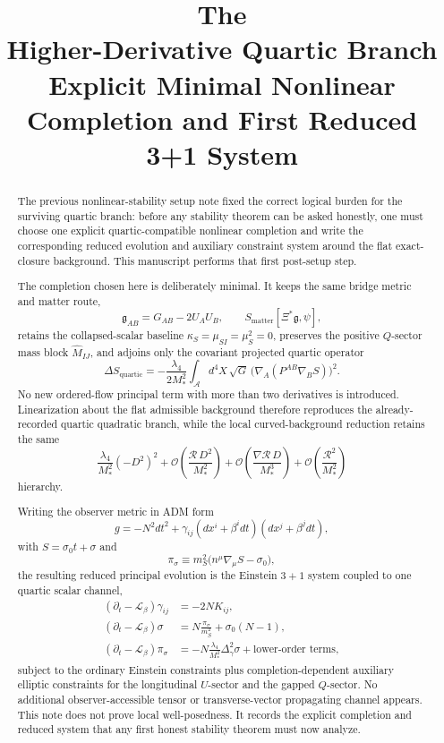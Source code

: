 \documentclass[11pt]{article}
\title{\textbf{The \TheoryName{}}\\[0.4em]
\large Higher-Derivative Quartic Branch Explicit Minimal Nonlinear Completion and First Reduced 3+1 System}
\author{}
\date{}
\newcommand{\Sub}{\mathcal{A}}
\newcommand{\BridgeMetric}{\mathfrak{g}}
\newcommand{\Ell}{\mathcal{L}}
\begin{document}
\maketitle

\begin{abstract}
The previous nonlinear-stability setup note fixed the correct logical burden for the surviving quartic branch: before any stability theorem can be asked honestly, one must choose one explicit quartic-compatible nonlinear completion and write the corresponding reduced evolution and auxiliary constraint system around the flat exact-closure background. This manuscript performs that first post-setup step.

The completion chosen here is deliberately minimal. It keeps the same bridge metric and matter route,
\[
\BridgeMetric_{AB}=G_{AB}-2U_AU_B,
\qquad
S_{\mathrm{matter}}[\Xi^*\BridgeMetric,\psi],
\]
retains the collapsed-scalar baseline \(\kappa_S=\mu_{SI}=\mu_S^2=0\), preserves the positive \(Q\)-sector mass block \(\widehat M_{IJ}\), and adjoins only the covariant projected quartic operator
\[
\Delta S_{\mathrm{quartic}}
=
-\frac{\lambda_4}{2M_*^2}
\int_{\Sub} d^4X\,\sqrt{G}\,
\bigl(\nabla_A(P^{AB}\nabla_B S)\bigr)^2.
\]
No new ordered-flow principal term with more than two derivatives is introduced. Linearization about the flat admissible background therefore reproduces the already-recorded quartic quadratic branch, while the local curved-background reduction retains the same
\[
\frac{\lambda_4}{M_*^2}(-D^2)^2
+ \mathcal O\!\left(\frac{\mathcal R\,D^2}{M_*^2}\right)
+ \mathcal O\!\left(\frac{\nabla\mathcal R\,D}{M_*^3}\right)
+ \mathcal O\!\left(\frac{\mathcal R^2}{M_*^2}\right)
\]
hierarchy.

Writing the observer metric in ADM form
\[
g=-N^2dt^2+\gamma_{ij}(dx^i+\beta^i dt)(dx^j+\beta^j dt),
\]
with \(S=\sigma_0 t+\sigma\) and
\[
\pi_\sigma
\equiv
m_S^2\bigl(n^\mu\nabla_\mu S-\sigma_0\bigr),
\]
the resulting reduced principal evolution is the Einstein \(3+1\) system coupled to one quartic scalar channel,
\begin{align*}
(\partial_t-\Ell_\beta)\gamma_{ij} &= -2N K_{ij},\\
(\partial_t-\Ell_\beta)\sigma &= N\frac{\pi_\sigma}{m_S^2}+\sigma_0(N-1),\\
(\partial_t-\Ell_\beta)\pi_\sigma
&=
-N\frac{\lambda_4}{M_*^2}\Delta_\gamma^2\sigma
+ \text{lower-order terms},
\end{align*}
subject to the ordinary Einstein constraints plus completion-dependent auxiliary elliptic constraints for the longitudinal \(U\)-sector and the gapped \(Q\)-sector. No additional observer-accessible tensor or transverse-vector propagating channel appears. This note does not prove local well-posedness. It records the explicit completion and reduced system that any first honest stability theorem must now analyze.
\end{abstract}
\end{document}
